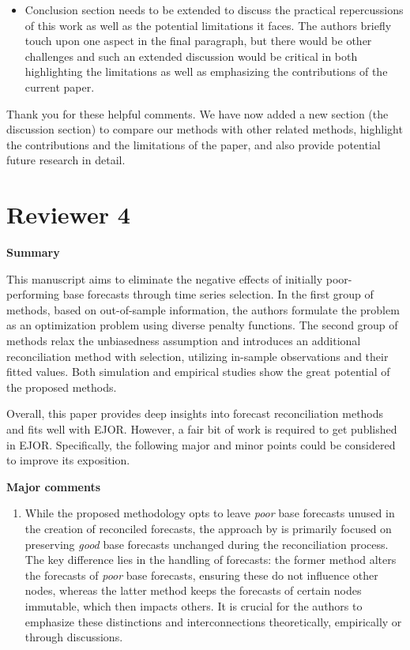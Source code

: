 \documentclass[11pt,a4paper,]{article}
\providecommand{\tightlist}{%
  \setlength{\itemsep}{0pt}\setlength{\parskip}{0pt}}
\renewenvironment{quote}
               {\list{}{\rightmargin\leftmargin}%
                \item\relax\color[RGB]{0,150,0}}
               {\endlist}
\begin{document}
\begin{itemize}
\tightlist
\item
  Conclusion section needs to be extended to discuss the practical
  repercussions of this work as well as the potential limitations it
  faces. The authors briefly touch upon one aspect in the final
  paragraph, but there would be other challenges and such an extended
  discussion would be critical in both highlighting the limitations as
  well as emphasizing the contributions of the current paper.
\end{itemize}

\begin{quote}
Thank you for these helpful comments. We have now added a new section
(the discussion section) to compare our methods with other related
methods, highlight the contributions and the limitations of the paper,
and also provide potential future research in detail.
\end{quote}

\section{Reviewer 4}\label{reviewer-4}

\textbf{Summary}

This manuscript aims to eliminate the negative effects of initially
poor-performing base forecasts through time series selection. In the
first group of methods, based on out-of-sample information, the authors
formulate the problem as an optimization problem using diverse penalty
functions. The second group of methods relax the unbiasedness assumption
and introduces an additional reconciliation method with selection,
utilizing in-sample observations and their fitted values. Both
simulation and empirical studies show the great potential of the
proposed methods.

Overall, this paper provides deep insights into forecast reconciliation
methods and fits well with EJOR. However, a fair bit of work is required
to get published in EJOR. Specifically, the following major and minor
points could be considered to improve its exposition.

\textbf{Major comments}

\begin{enumerate}
\def\labelenumi{\arabic{enumi}.}
\tightlist
\item
  While the proposed methodology opts to leave \emph{poor} base
  forecasts unused in the creation of reconciled forecasts, the approach
  by \textcite{Zhang2023-op} is primarily focused on preserving
  \emph{good} base forecasts unchanged during the reconciliation
  process. The key difference lies in the handling of forecasts: the
  former method alters the forecasts of \emph{poor} base forecasts,
  ensuring these do not influence other nodes, whereas the latter method
  keeps the forecasts of certain nodes immutable, which then impacts
  others. It is crucial for the authors to emphasize these distinctions
  and interconnections theoretically, empirically or through
  discussions.
\end{enumerate}
\end{document}
